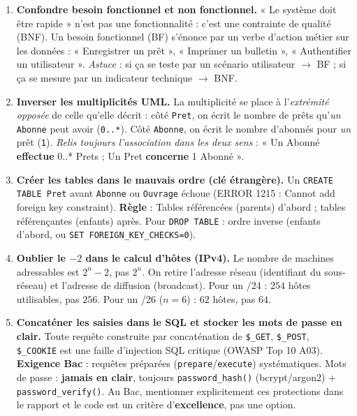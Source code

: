 \documentclass[11pt]{article}
\begin{document}
\begin{attention}
\begin{enumerate}
\item \textbf{Confondre besoin fonctionnel et non fonctionnel.} « Le système doit être rapide » n'est pas une fonctionnalité : c'est une contrainte de qualité (BNF). Un besoin fonctionnel (BF) s'énonce par un verbe d'action métier sur les données : « Enregistrer un prêt », « Imprimer un bulletin », « Authentifier un utilisateur ». \textit{Astuce} : si ça se teste par un scénario utilisateur $\rightarrow$ BF ; si ça se mesure par un indicateur technique $\rightarrow$ BNF.
\item \textbf{Inverser les multiplicités UML.} La multiplicité se place à l'\emph{extrémité opposée} de celle qu'elle décrit : côté \texttt{Pret}, on écrit le nombre de prêts qu'\emph{un} \texttt{Abonne} peut avoir (\texttt{0..*}). Côté \texttt{Abonne}, on écrit le nombre d'abonnés pour \emph{un} prêt (\texttt{1}). \textit{Relis toujours l'association dans les deux sens} : « Un Abonné \textbf{effectue} 0..* Prets ; Un Pret \textbf{concerne} 1 Abonné ».
\item \textbf{Créer les tables dans le mauvais ordre (clé étrangère).} Un \texttt{CREATE TABLE Pret} avant \texttt{Abonne} ou \texttt{Ouvrage} échoue (ERROR 1215 : Cannot add foreign key constraint). \textbf{Règle} : Tables référencées (parents) d'abord ; tables référençantes (enfants) après. Pour \texttt{DROP TABLE} : ordre inverse (enfants d'abord, ou \texttt{SET FOREIGN\_KEY\_CHECKS=0}).
\item \textbf{Oublier le $-2$ dans le calcul d'hôtes (IPv4).} Le nombre de machines adressables est $2^{n} - 2$, pas $2^{n}$. On retire l'adresse réseau (identifiant du sous-réseau) et l'adresse de diffusion (broadcast). Pour un /24 : $254$ hôtes utilisables, pas $256$. Pour un /26 ($n=6$) : $62$ hôtes, pas $64$.
\item \textbf{Concaténer les saisies dans le SQL et stocker les mots de passe en clair.} Toute requête construite par concaténation de \texttt{\$\_GET}, \texttt{\$\_POST}, \texttt{\$\_COOKIE} est une faille d'injection SQL critique (OWASP Top 10 A03). \textbf{Exigence Bac} : requêtes préparées (\texttt{prepare}/\texttt{execute}) systématiques. Mots de passe : \textbf{jamais en clair}, toujours \texttt{password\_hash()} (bcrypt/argon2) + \texttt{password\_verify()}. Au Bac, mentionner explicitement ces protections dans le rapport et le code est un critère d'\textbf{excellence}, pas une option.
\end{enumerate}
\end{attention}
\end{document}
